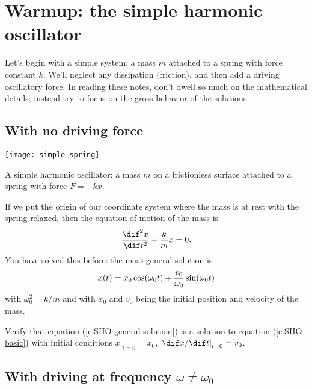 
\section{Warmup: the simple harmonic oscillator}

Let's begin with a simple system: a mass $m$ attached to a spring with force constant $k$. We'll neglect any dissipation (friction), and then add a driving oscillatory force. In reading these notes, don't dwell so much on the mathematical details; instead try to focus on the gross behavior of the solutions.

\subsection{With no driving force}

\begin{marginfigure}
\texttt{[image: simple-spring]}
\caption[A simple harmonic oscillator]{A simple harmonic oscillator: a mass $m$ on a frictionless surface attached to a  spring with force $F = -kx$.
\label{f.simple-spring}}
\end{marginfigure}

If we put the origin of our coordinate system where the mass is at rest with the spring relaxed, then the equation of motion of the mass is
\begin{equation}\label{e.SHO-basic}
	\DDtt{x} + \frac{k}{m} x = 0.
\end{equation}
You have solved this before: the most general solution is
\begin{equation}\label{e.SHO-general-solution}
	x(t) = x_{0}\cos(\omega_{0} t) + \frac{v_{0}}{\omega_{0}}\sin(\omega_{0} t)
\end{equation}
with $\omega_{0}^{2} = k/m$ and with $x_{0}$ and $v_{0}$ being the initial position and velocity of the mass.

\begin{exercisebox}
Verify that equation (\ref{e.SHO-general-solution}) is a solution to equation (\ref{e.SHO-basic}) with initial conditions $\left.x\right|_{t=0}=x_{0}$, $\left.\dif x/\dif t\right|_{t=0} = v_{0}$.
\end{exercisebox}

\subsection{With driving at frequency $\omega \neq \omega_{0}$}

